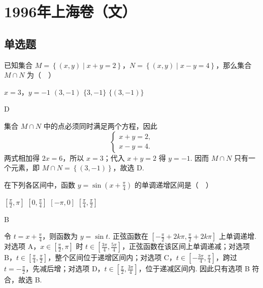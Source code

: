 \chapter{1996年上海卷（文）}
\section{单选题}

\begin{problem}
已知集合 \(M=\left\{(x,y)\mid x+y=2\right\}\)，\(N=\left\{(x,y)\mid x-y=4\right\}\)，那么集合 \(M\cap N\) 为（\(\quad\)）

\choices
    {\(x=3\)，\(y=-1\)}
    {\((3,-1)\)}
    {\(\{3,-1\}\)}
    {\(\{(3,-1)\}\)}
\end{problem}

\begin{answer}
D
\end{answer}

\begin{solution}
集合 \(M\cap N\) 中的点必须同时满足两个方程，因此
\[
\begin{cases}
x+y=2,\\
x-y=4.
\end{cases}
\]
两式相加得 \(2x=6\)，所以 \(x=3\)；代入 \(x+y=2\) 得 \(y=-1\). 因而 \(M\cap N\) 只有一个元素，即 \(M\cap N=\left\{(3,-1)\right\}\)，故选 D.
\end{solution}

\begin{problem}
在下列各区间中，函数 \(y=\sin\left(x+\frac{\pi}{4}\right)\) 的单调递增区间是（\(\quad\)）

\choices
    {\(\left[\frac{\pi}{2},\pi\right]\)}
    {\(\left[0,\frac{\pi}{4}\right]\)}
    {\(\left[-\pi,0\right]\)}
    {\(\left[\frac{\pi}{4},\frac{\pi}{2}\right]\)}
\end{problem}

\begin{answer}
B
\end{answer}

\begin{solution}
令 \(t=x+\frac{\pi}{4}\)，则函数为 \(y=\sin t\). 正弦函数在
\(\left[-\frac{\pi}{2}+2k\pi,\frac{\pi}{2}+2k\pi\right]\)
上单调递增. 对选项 A，\(x\in\left[\frac{\pi}{2},\pi\right]\) 时
\(t\in\left[\frac{3\pi}{4},\frac{5\pi}{4}\right]\)，正弦函数在该区间上单调递减；对选项 B，\(t\in\left[\frac{\pi}{4},\frac{\pi}{2}\right]\)，整个区间位于递增区间内；对选项 C，\(t\in\left[-\frac{3\pi}{4},\frac{\pi}{4}\right]\)，跨过 \(t=-\frac{\pi}{2}\)，先减后增；对选项 D，\(t\in\left[\frac{\pi}{2},\frac{3\pi}{4}\right]\)，位于递减区间内. 因此只有选项 B 符合，故选 B.
\end{solution}

